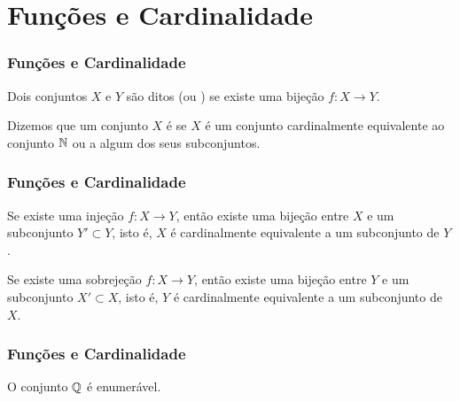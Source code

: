 \documentclass[brazil, notheorems, 10pt]{beamer}
\begin{document}
\section{Funções e Cardinalidade}
\begin{frame}
\frametitle{Funções e Cardinalidade} %

\begin{Def}
Dois conjuntos $X$ e $Y$ são ditos 
(ou ) se existe uma bijeção $f : X \to Y$.
\end{Def}

\begin{Def}
Dizemos que um conjunto $X$ é  se $X$ é um conjunto
cardinalmente equivalente ao conjunto $\mathbb{N}$ ou a algum dos seus
subconjuntos.
\end{Def}


\end{frame}




\begin{frame}
\frametitle{Funções e Cardinalidade} %

\begin{Teo}
Se existe uma injeção $f: X \to Y$, então existe uma bijeção entre
$X$ e um subconjunto $Y' \subset Y$, isto é, $X$ é cardinalmente
equivalente a um subconjunto de $Y$.
\end{Teo} \pause

\begin{Teo}
Se existe uma sobrejeção $f : X \to Y$, então existe uma bijeção
entre $Y$ e um subconjunto $X' \subset X$, isto é, $Y$ é
cardinalmente equivalente a um subconjunto de $X$.
\end{Teo}

\end{frame}


\begin{frame}
\frametitle{Funções e Cardinalidade} %

\begin{Exem}
O conjunto $\mathbb{Q}$ é enumerável.
\end{Exem}

\end{frame}
\end{document}
